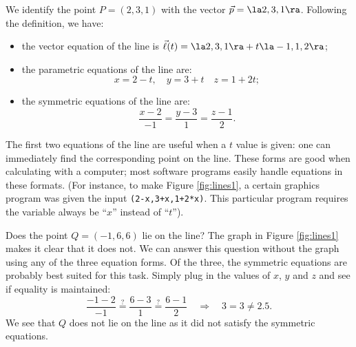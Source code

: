 {We identify the point $P=(2,3,1)$ with the vector $\vec p =\la 2,3,1\ra$. Following the definition, we have:
\begin{itemize}
	\item the vector equation of the line is $\vec\ell(t) = \la 2,3,1\ra + t\la -1,1,2\ra$;
	\item	the parametric equations of the line are:
	$$x = 2-t,\quad y = 3+t\quad z = 1+2t;$$
	\item	the symmetric equations of the line are:
	$$\frac{x-2}{-1}=\frac{y-3}{1} = \frac{z-1}{2}.$$
\end{itemize}

The first two equations of the line are useful when a $t$ value is given: one can immediately find the corresponding point on the line. These forms are good when calculating with a computer; most software programs easily handle equations in these formats. (For instance, to make Figure \ref{fig:lines1}, a certain graphics program was given the input \texttt{(2-x,3+x,1+2*x)}. This particular program requires the variable always be ``$x$'' instead of ``$t$'').

Does the point $Q = (-1,6,6)$ lie on the line? The graph in Figure \ref{fig:lines1} makes it clear that it does not. We can answer this question without the graph using any of the three equation forms. Of the three, the symmetric equations are probably best suited for this task. Simply plug in the values of $x$, $y$ and $z$ and see if equality is maintained:
$$ \frac{-1-2}{-1} \stackrel{?}{=} \frac{6-3}{1} \stackrel{?}{=} \frac{6-1}{2} \quad \Rightarrow \quad 3=3\neq2.5.$$
We see that $Q$ does not lie on the line as it did not satisfy the symmetric equations.
}\\

